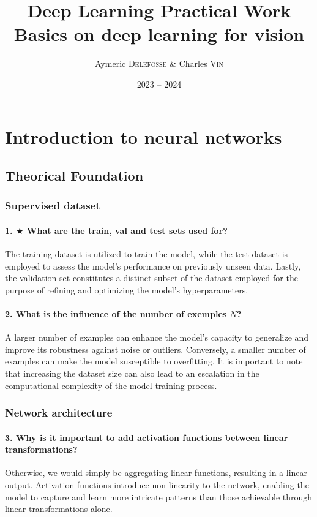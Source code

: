 \documentclass{article}
\title{
    Deep Learning Practical Work \\
    \Large \textbf{Basics on deep learning for vision}
}
\author{Aymeric \textsc{Delefosse} \& Charles \textsc{Vin}}
\date{2023 -- 2024}
\theoremstyle{plain}%
\theoremstyle{definition}
\theoremstyle{remark}
\begin{document}
\maketitle
\tableofcontents
\newpage

\section{Introduction to neural networks}
\subsection{Theorical Foundation}
\subsubsection{Supervised dataset}
\paragraph{1. $\bigstar$ What are the train, val and test sets used for?}
The training dataset is utilized to train the model, while the test dataset is employed to assess the model's performance on previously unseen data. Lastly, the validation set constitutes a distinct subset of the dataset employed for the purpose of refining and optimizing the model's hyperparameters.

\paragraph{2. What is the influence of the number of exemples $N$?}
A larger number of examples can enhance the model's capacity to generalize and improve its robustness against noise or outliers. Conversely, a smaller number of examples can make the model susceptible to overfitting. It is important to note that increasing the dataset size can also lead to an escalation in the computational complexity of the model training process.

\subsubsection{Network architecture}
\paragraph{3. Why is it important to add activation functions between linear transformations?}
Otherwise, we would simply be aggregating linear functions, resulting in a linear output. Activation functions introduce non-linearity to the network, enabling the model to capture and learn more intricate patterns than those achievable through linear transformations alone.
\end{document}
